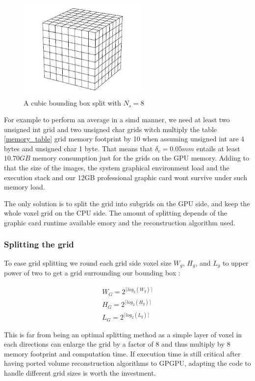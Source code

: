 \documentclass[12pt,journal,compsoc]{IEEEtran}
\begin{document}
\begin{figure}[!h]
\centering
\includegraphics[width=2.5in]{grid}
\caption{A cubic bounding box split with $N_s=8$}
\label{grid}
\end{figure}

For example to perform an average in a \acl{simd} manner, we need at least two unsigned int grid and two unsigned char grids witch multiply the table \ref{memory_table} grid memory footprint by 10 when assuming unsigned int are 4 bytes and unsigned char 1 byte.
That means that $\delta_v=0.05mm$ entails at least $10.70GB$ memory consumption just for the grids on the GPU memory.
Adding to that the size of the images, the system graphical environment load and the execution stack and our 12GB professional graphic card wont survive under such memory load.

The only solution is to split the grid into subgrids on the GPU side, and keep the whole voxel grid on the CPU side. The amount of splitting depends of the graphic card runtime available emory and the reconstruction algorithm used.

\subsubsection{Splitting the grid}
To ease grid splitting we round each grid side voxel size $W_g$, $H_g$, and $L_g$ to upper power of two to get a grid surrounding our bounding box :

\begin{eqnarray}
	W_G = 2^{\lceil log_2(W_g) \rceil}\\
	H_G = 2^{\lceil log_2(H_g) \rceil}\\
	L_G = 2^{\lceil log_2(L_g) \rceil}
\end{eqnarray}

This is far from being an optimal splitting method as a simple layer of voxel in each directions can enlarge the grid by a factor of 8 and thus multiply by 8 memory footprint and computation time. 
If execution time is still critical after having ported volume reconstruction algorithms to GPGPU, adapting the code to handle different grid sizes is worth the investment.
\end{document}
